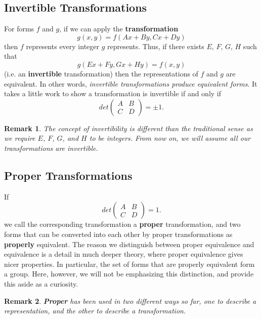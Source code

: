 \documentclass[12pt]{article}
\newtheorem*{remark}{Remark}
\begin{document}
\subsection{Invertible Transformations}
For forms $f$ and $g$, if we can apply the \textbf{transformation}
\begin{equation*}
    g(x, y) = f(Ax + By, Cx + Dy)
\end{equation*}
then $f$ represents every integer $g$ represents. Thus, if there exists $E$, $F$, $G$, $H$ such that
\begin{equation*}
    g(Ex + Fy, Gx + Hy) = f(x, y)
\end{equation*}
(i.e. an \textbf{invertible} transformation) then the representations of $f$ and $g$ are equivalent. In other words, \textit{invertible transformations produce equivalent forms}. It takes a little work to show a transformation is invertible if and only if
\begin{equation}
    det
    \begin{pmatrix}
    A & B \\
    C & D
    \end{pmatrix}
    = \pm 1.
\end{equation}
\begin{remark}
    The concept of invertibility is different than the traditional sense as we require $E$, $F$, $G$, and $H$ to be integers. From now on, we will assume all our transformations are invertible.
\end{remark}

\subsection{Proper Transformations}
If 
\begin{equation}
    det
    \begin{pmatrix}
    A & B \\
    C & D
    \end{pmatrix}
    = 1.
\end{equation}
we call the corresponding transformation a \textbf{proper} transformation, and two forms that can be converted into each other by proper transformations as \textbf{properly} equivalent. The reason we distinguish between proper equivalence and equivalence is a detail in much deeper theory, where proper equivalence gives nicer properties. In particular, the set of forms that are properly equivalent form a group. Here, however, we will not be emphasizing this distinction, and provide this aside as a curiosity.
\begin{remark}
    \textbf{Proper} has been used in two different ways so far, one to describe a representation, and the other to describe a transformation.
\end{remark}
\end{document}
